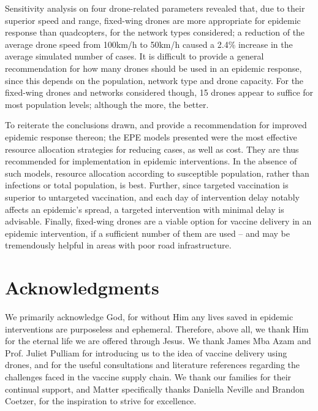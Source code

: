 \documentclass[10pt,letterpaper]{article}
\begin{document}
Sensitivity analysis on four drone-related parameters revealed that, due to their superior speed and range, fixed-wing drones are more appropriate for epidemic response than quadcopters, for the network types considered; a reduction of the average drone speed from 100km/h to 50km/h caused a 2.4\% increase in the average simulated number of cases. It is difficult to provide a general recommendation for how many drones should be used in an epidemic response, since this depends on the population, network type and drone capacity. For the fixed-wing drones and networks considered though, 15 drones appear to suffice for most population levels; although the more, the better.

To reiterate the conclusions drawn, and provide a recommendation for improved epidemic response thereon; the EPE models presented were the most effective resource allocation strategies for reducing cases, as well as cost. They are thus recommended for implementation in epidemic interventions. In the absence of such models, resource allocation according to susceptible population, rather than infections or total population, is best. Further, since targeted vaccination is superior to untargeted vaccination, and each day of intervention delay notably affects an epidemic's spread, a targeted intervention with minimal delay is advisable. Finally, fixed-wing drones are a viable option for vaccine delivery in an epidemic intervention, if a sufficient number of them are used -- and may be tremendously helpful in areas with poor road infrastructure.

\section*{Acknowledgments}
We primarily acknowledge God, for without Him any lives saved in epidemic interventions are purposeless and ephemeral. Therefore, above all, we thank Him for the eternal life we are offered through Jesus.
We thank James Mba Azam and Prof. Juliet Pulliam for introducing us to the idea of vaccine delivery using drones, and for the useful consultations and literature references regarding the challenges faced in the vaccine supply chain. We thank our families for their continual support, and Matter specifically thanks Daniella Neville and Brandon Coetzer, for the inspiration to strive for excellence.

\nolinenumbers

\end{document}
